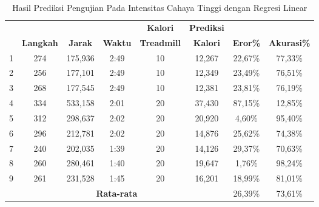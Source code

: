 \begin{longtable}{|c|c|c|c|c|c|c|c|}
  \caption{Hasil Prediksi Pengujian Pada Intensitas Cahaya Tinggi dengan Regresi Linear}
  \label{tb:PengujianIntensitasTinggiAnalisaPrediksiRegresi}                                   \\
  \hline
  \rowcolor[HTML]{C0C0C0}
  & & & & \textbf{Kalori} & \textbf{Prediksi} & & \\
  \rowcolor[HTML]{C0C0C0}
  \multirow{-2}{*}{\textbf{Percobaan}} & \multirow{-2}{*}{\textbf{Langkah}} & \multirow{-2}{*}{\textbf{Jarak}} & \multirow{-2}{*}{\textbf{Waktu}} & \textbf{Treadmill} & \textbf{Kalori} & \multirow{-2}{*}{\textbf{Eror\%}} & \multirow{-2}{*}{\textbf{Akurasi\%}} \\
  
  \hline
  1   & 274   & 175,936    & 2:49    & 10    & 12,267   & 22,67\%      & 77,33\%   \\
  \hline  
  2   & 256   & 177,101    & 2:49    & 10    & 12,349   & 23,49\%      & 76,51\%  \\
  \hline
  3   & 268   & 177,545    & 2:49    & 10    & 12,381   & 23,81\%      & 76,19\%   \\
  \hline
  4   & 334   & 533,158    & 2:01    & 20    & 37,430   & 87,15\%      & 12,85\%  \\
  \hline
  5   & 312   & 298,637    & 2:02    & 20    & 20,920   & 4,60\%       & 95,40\%    \\
  \hline
  6   & 296   & 212,781    & 2:02    & 20    & 14,876   & 25,62\%      & 74,38\%   \\
  \hline
  7   & 240   & 202,035    & 1:39    & 20    & 14,126   & 29,37\%      & 70,63\%   \\
  \hline
  8   & 260   & 280,461    & 1:40    & 20    & 19,647   & 1,76\%       & 98,24\%   \\
  \hline
  9   & 261   & 231,528    & 1:45    & 20    & 16,201   & 18,99\%      & 81,01\%   \\
  \hline

  \multicolumn{6}{|c|}{\textbf{Rata-rata}} & 26,39\% & 73,61\% \\
  \hline
\end{longtable}


